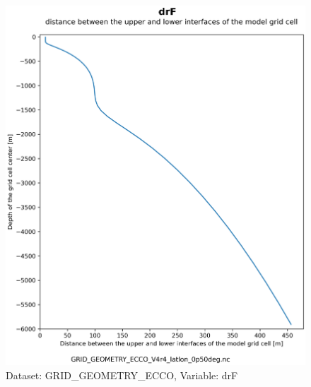 \begin{figure}[H]
\centering
\includegraphics[scale=0.55]{../images/plots/latlon_plots_coords/Geometry_Parameters_for_the_0.5_degree_Lat-Lon_Model_Grid_(Version_4_Release_4)/drF.png}
\caption{Dataset: GRID\_GEOMETRY\_ECCO, Variable: drF}
\label{tab:table-GRID_GEOMETRY_ECCO_drF-Plot}
\end{figure}
\newpage
\pagebreak
